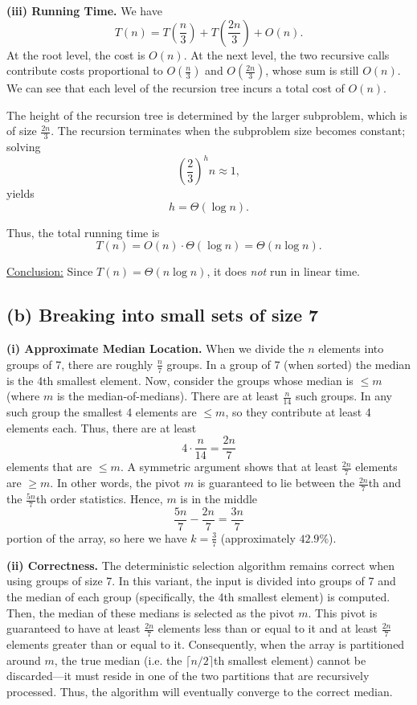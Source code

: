 \documentclass[11pt]{article}
\begin{document}
    \textbf{(iii) Running Time.}  
    We have
    \[
    T(n)= T\left(\frac{n}{3}\right) + T\left(\frac{2n}{3}\right) + O(n).
    \]
    At the root level, the cost is \(O(n)\). At the next level, the two recursive calls contribute costs proportional to \(O\left(\frac{n}{3}\right)\) and \(O\left(\frac{2n}{3}\right)\), whose sum is still \(O(n)\). We can see that each level of the recursion tree incurs a total cost of \(O(n)\).  
    
    The height of the recursion tree is determined by the larger subproblem, which is of size \(\frac{2n}{3}\). The recursion terminates when the subproblem size becomes constant; solving
    \[
    \left(\frac{2}{3}\right)^h n \approx 1,
    \]
    yields
    \[
    h = \Theta(\log n).
    \]
    
    Thus, the total running time is
    \[
    T(n)=O(n) \cdot \Theta(\log n)=\Theta(n\log n).
    \]
    
    \medskip
    
    \underline{Conclusion:}  
    Since \(T(n)=\Theta(n\log n)\), it does \emph{not} run in linear time.
    
    \bigskip
    
    \subsection*{(b) Breaking into small sets of size 7}
    
    \textbf{(i) Approximate Median Location.}  
    When we divide the \(n\) elements into groups of 7, there are roughly \(\frac{n}{7}\) groups. In a group of 7 (when sorted) the median is the 4th smallest element. Now, consider the groups whose median is \(\le m\) (where \(m\) is the median-of-medians). There are at least \(\frac{n}{14}\) such groups. In any such group the smallest 4 elements are \(\le m\), so they contribute at least 4 elements each. Thus, there are at least
    \[
    4\cdot\frac{n}{14} = \frac{2n}{7}
    \]
    elements that are \(\le m\). A symmetric argument shows that at least \(\frac{2n}{7}\) elements are \(\ge m\). In other words, the pivot \(m\) is guaranteed to lie between the \(\frac{2n}{7}\)th and the \(\frac{5n}{7}\)th order statistics. Hence, \(m\) is in the middle
    \[
    \frac{5n}{7} - \frac{2n}{7} = \frac{3n}{7}
    \]
    portion of the array, so here we have \(k = \frac{3}{7}\) (approximately \(42.9\%\)).
    
    \medskip

    \textbf{(ii) Correctness.}  
    The deterministic selection algorithm remains correct when using groups of size 7. In this variant, the input is divided into groups of 7 and the median of each group (specifically, the 4th smallest element) is computed. Then, the median of these medians is selected as the pivot \(m\). This pivot is guaranteed to have at least \(\frac{2n}{7}\) elements less than or equal to it and at least \(\frac{2n}{7}\) elements greater than or equal to it. Consequently, when the array is partitioned around \(m\), the true median (i.e. the \(\lceil n/2 \rceil\)th smallest element) cannot be discarded—it must reside in one of the two partitions that are recursively processed. Thus, the algorithm will eventually converge to the correct median.
    
\end{document}
